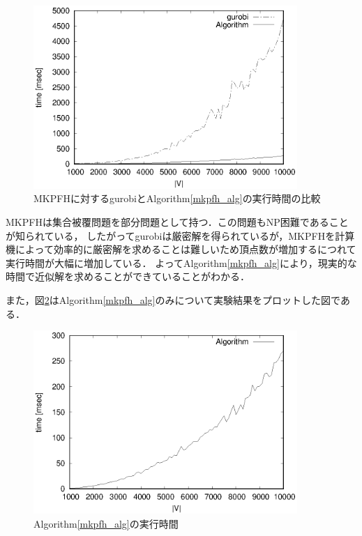 \documentclass[11pt,dvipdfmx]{jarticle}
\numberwithin{equation}{section}
\begin{document}
            \begin{figure}[htbp]
                \begin{center}
                    \includegraphics[width=100mm]{jikken3.eps}
                \end{center}
                \caption{MKPFHに対するgurobiとAlgorithm\ref{mkpfh_alg}の実行時間の比較}
                \label{test3}
            \end{figure}
            MKPFHは集合被覆問題\cite{kp_np}を部分問題として持つ．この問題もNP困難であることが知られている，
            したがってgurobiは厳密解を得られているが，MKPFHを計算機によって効率的に厳密解を求めることは難しいため頂点数が増加するにつれて実行時間が大幅に増加している．
            よってAlgorithm\ref{mkpfh_alg}により，現実的な時間で近似解を求めることができていることがわかる．\par
            また，図\ref{test4}はAlgorithm\ref{mkpfh_alg}のみについて実験結果をプロットした図である．\par
            \begin{figure}[htbp]
                \begin{center}
                    \includegraphics[width=100mm]{jikken4.eps}
                \end{center}
                \caption{Algorithm\ref{mkpfh_alg}の実行時間}
                \label{test4}
            \end{figure}
\end{document}
